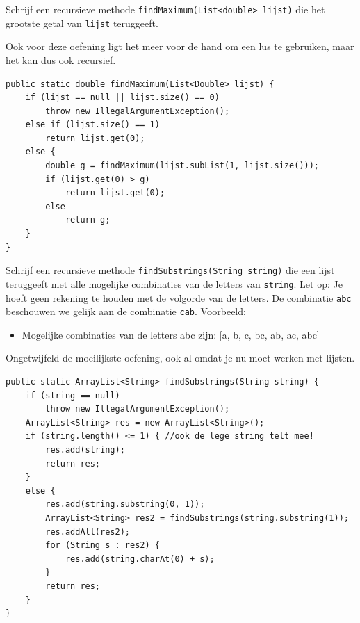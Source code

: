 \begin{oef}
\code Schrijf een recursieve methode \verb/findMaximum(List<double> lijst)/ die het grootste getal van \verb/lijst/ teruggeeft. 
\begin{opl}
Ook voor deze oefening ligt het meer voor de hand om een lus te gebruiken, maar het kan dus ook recursief.
\begin{lstlisting}[caption={Maximum van een lijst getallen}, label=recfindmaximum]
public static double findMaximum(List<Double> lijst) {
	if (lijst == null || lijst.size() == 0)
		throw new IllegalArgumentException();
	else if (lijst.size() == 1)
		return lijst.get(0);
	else {
		double g = findMaximum(lijst.subList(1, lijst.size()));
		if (lijst.get(0) > g)
			return lijst.get(0);
		else
			return g;
	}
}
\end{lstlisting}
\end{opl}

\end{oef}

\begin{oef}
\code Schrijf een recursieve methode \verb/findSubstrings(String string)/ die een lijst teruggeeft met alle mogelijke combinaties van de letters van \verb/string/. Let op: Je hoeft geen rekening te houden met de volgorde van de letters. De combinatie \verb/abc/ beschouwen we gelijk aan de combinatie \verb/cab/.
Voorbeeld:
\begin{itemize}
\item Mogelijke combinaties van de letters abc zijn: [a, b, c, bc, ab, ac, abc]
\end{itemize}
\begin{opl}
Ongetwijfeld de moeilijkste oefening, ook al omdat je nu moet werken met lijsten.
\begin{lstlisting}[caption={Alle substrings van een gegeven string}, label=recfindsubstrings]
public static ArrayList<String> findSubstrings(String string) {
	if (string == null)
		throw new IllegalArgumentException();
	ArrayList<String> res = new ArrayList<String>();
	if (string.length() <= 1) { //ook de lege string telt mee!
		res.add(string);
		return res;
	}
	else {
		res.add(string.substring(0, 1));
		ArrayList<String> res2 = findSubstrings(string.substring(1));
		res.addAll(res2);
		for (String s : res2) {
			res.add(string.charAt(0) + s);
		}
		return res;
	}
}
\end{lstlisting}
\end{opl}

\end{oef}

